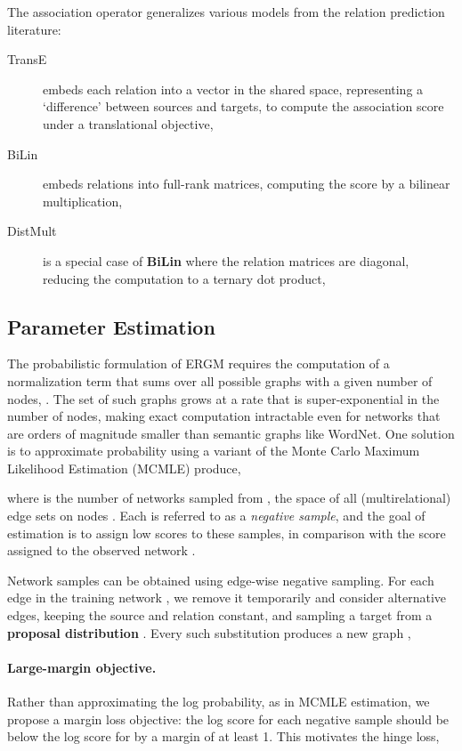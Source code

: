 \documentclass[11pt,twocolumn]{article}
\newcommand{\WN}[0]{WordNet}
\newcommand{\ergm}[0]{ERGM}
\begin{document}
The association operator generalizes various models from the relation prediction literature:

\begin{description}
\item[TransE] \cite{bordes2013translating} embeds each relation  into a vector in the shared space, representing a `difference' between sources and targets, to compute the association score under a translational objective,

\item[BiLin] \cite{nickel2011three} embeds relations into full-rank matrices, computing the score by a bilinear multiplication,

\item[DistMult] \cite{yang2014embedding} is a special case of \textbf{BiLin} where the relation matrices are diagonal, reducing the computation to a ternary dot product,
\end{description}


\subsection{Parameter Estimation}
\label{ssec:learn}

The probabilistic formulation of \ergm{} requires the computation of a normalization term that sums over all possible graphs with a given number of nodes, . The set of such graphs grows at a rate that is super-exponential in the number of nodes, making exact computation intractable even for networks that are orders of magnitude smaller than semantic graphs like \WN. One solution is to approximate probability using a variant of the Monte Carlo Maximum Likelihood Estimation (MCMLE) produce,

where  is the number of networks  sampled from , the space of all (multirelational) edge sets on nodes . Each  is referred to as a \emph{negative sample}, and the goal of estimation is to assign low scores to these samples, in comparison with the score assigned to the observed network .

Network samples can be obtained using edge-wise negative sampling.
For each edge  in the training network , we remove it temporarily and consider  alternative edges, keeping the source  and relation  constant, and sampling a target  from a \textbf{proposal distribution} . Every such substitution produces a new graph ,


\paragraph{Large-margin objective.}
Rather than approximating the log probability, as in MCMLE estimation, we propose a margin loss objective: the log score for each negative sample  should be below the log score for  by a margin of at least 1. This motivates the hinge loss,
\end{document}
